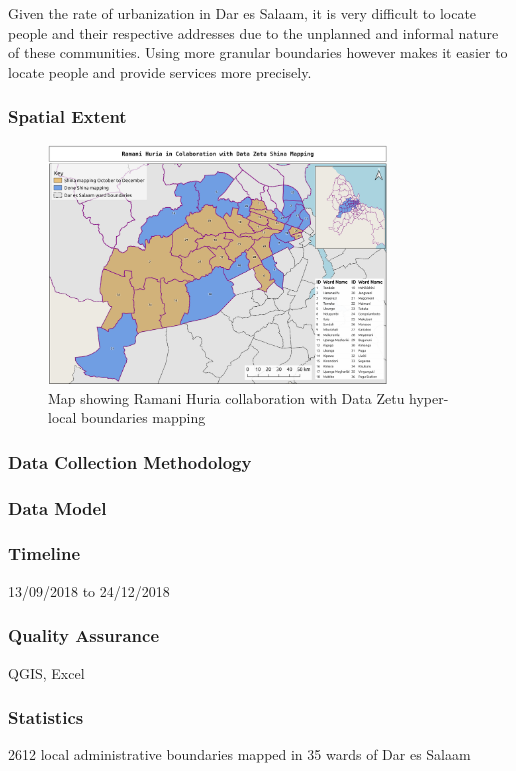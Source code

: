 \documentclass[a4paper,12pt,twoside]{article}
\begin{document}
Given the rate of urbanization in Dar es Salaam, it is very difficult to locate people and their respective addresses due to the unplanned and informal nature of these communities. Using more granular boundaries however makes it easier to locate people and provide services more precisely. 

\subsubsection{Spatial Extent}
\begin{figure}[h]
  \color{RHgreen}\caption{Map showing Ramani Huria collaboration with Data Zetu hyper-local boundaries mapping}
  \centering
  \includegraphics[width=0.8\textwidth]{images/RH_DZ_shina_boundaries.png}
\end{figure}

\subsubsection{Data Collection Methodology}

\subsubsection{Data Model}

\subsubsection{Timeline}
13/09/2018 to 24/12/2018

\subsubsection{Quality Assurance}
QGIS, Excel

\subsubsection{Statistics}
2612 local administrative boundaries mapped in 35 wards of Dar es Salaam
\end{document}
